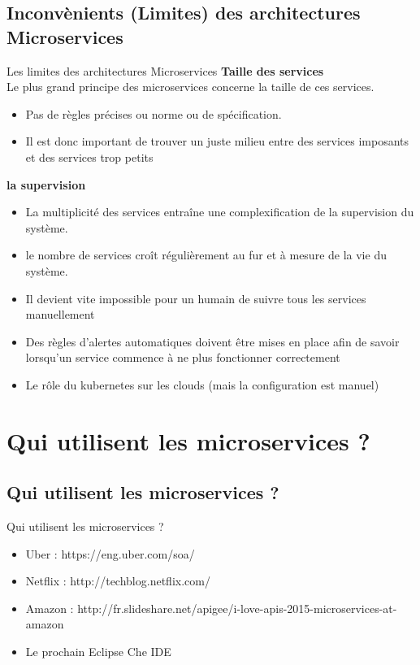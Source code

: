 \documentclass{beamer}
\begin{document}
\subsection{Inconv\`enients (Limites) des architectures Microservices}
    \begin{frame}{Les limites des architectures Microservices}
        \textbf{Taille des services}\\
        Le plus grand principe des microservices concerne la taille de ces services.
        \begin{itemize} 
            \item Pas de règles précises ou norme ou de spécification.
            \item Il est donc important de trouver un juste milieu entre des services imposants et des services trop petits
        \end{itemize} 
        \textbf{la supervision}
        \begin{itemize}
            \item La multiplicité des services entraîne une complexification de la supervision du système.
            \item le nombre de services croît régulièrement au fur et à mesure de la vie du système. 
            \item Il devient vite impossible pour un humain de suivre tous les services manuellement
            \item Des règles d’alertes automatiques doivent être mises en
                place afin de savoir lorsqu’un service
                commence à ne plus fonctionner correctement
            \item \alert{Le rôle du kubernetes sur les clouds (mais la configuration est manuel)}
        \end{itemize} 
    \end{frame}

\section{Qui utilisent les microservices ?}
\subsection{Qui utilisent les microservices ?}
\begin{frame}{Qui utilisent les microservices ?}
    \begin{itemize}
        \item Uber : https://eng.uber.com/soa/
        \item Netflix : http://techblog.netflix.com/
        \item Amazon : http://fr.slideshare.net/apigee/i-love-apis-2015-microservices-at-amazon
        \item Le prochain Eclipse Che IDE
    \end{itemize} 
\end{frame}
\end{document}
